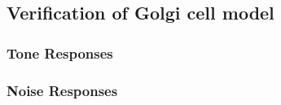 





\subsection{Verification of Golgi cell model}
 \subsubsection{Tone Responses}




 \subsubsection{Noise Responses}



